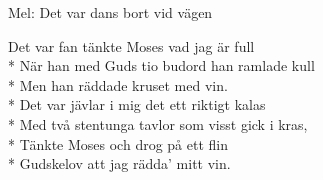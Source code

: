 \begin{SongText}
    \begin{SongInfo}
        Mel: Det var dans bort vid vägen
    \end{SongInfo}
    \begin{SongVerse}
        Det var fan tänkte Moses vad jag är full\\*%
        När han med Guds tio budord han ramlade kull\\*%
        Men han räddade kruset med vin.\\*%
        Det var jävlar i mig det ett riktigt kalas\\*%
        Med två stentunga tavlor som visst gick i kras,\\*%
        Tänkte Moses och drog på ett flin\\*%
        Gudskelov att jag rädda’ mitt vin.
    \end{SongVerse}
\end{SongText}
